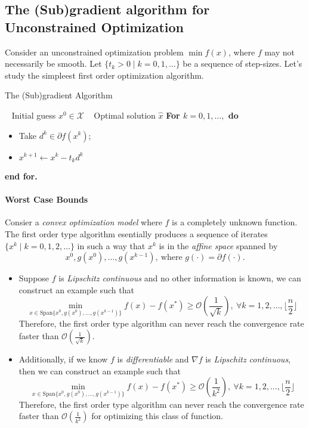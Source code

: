 \subsection{The (Sub)gradient algorithm for Unconstrained Optimization}
Consider an unconstrained optimization problem $\min f(x)$, where $f$ may not necessarily be smooth. Let $\{t_k>0\mid k=0,1,\dots\}$ be a sequence of step-sizes. Let's study the simpleest first order optimization algorithm.
\begin{algorithm}[htb] 
\caption{The (Sub)gradient Algorithm} 
\label{alg:GA} 
\begin{algorithmic}[0] %
\REQUIRE ~ %
Initial guess $x^0\in\mathcal{X}$
\ENSURE ~ %
Optimal solution $\hat x$
\STATE \textbf{For $k=0,1,\dots,$ do}
\begin{itemize}
\item
Take $d^k\in\partial f(x^k)$;
\item
$x^{k+1} \leftarrow x^k - t_kd^k $
\end{itemize}
\textbf{end for.}
\label{code:GA}
\end{algorithmic}
\end{algorithm}
\paragraph{Worst Case Bounds}
Consier a \emph{convex optimization model} where $f$ is a completely unknown function. 
The first order type algorithm esentially produces a sequence of iterates $\{x^k\mid k=0,1,2,\dots\}$ in such a way that $x^k$ is in the \emph{affine space} spanned by
\[
x^0,g(x^0),\dots,g(x^{k-1}),\ \text{where }g(\cdot) = \partial f(\cdot).
\]
\begin{itemize}
\item
Suppose $f$ is \emph{Lipschitz continuous} and no other information is known, we can construct an example such that
\[
\min_{x\in\text{Span}\{x^0,g(x^0),\dots,g(x^{k-1})\}}f(x) - f(x^*)\ge \mathcal{O}(\frac{1}{\sqrt{k}}),\ \forall k=1,2,\dots,\lfloor\frac{n}{2}\rfloor
\]
Therefore, the first order type algorithm can never reach the convergence rate faster than $\mathcal{O}(\frac{1}{\sqrt{k}})$.
\item
Additionally, if we know $f$ is \emph{differentiable} and $\nabla f$ is \emph{Lipschitz continuous}, then we can construct an example such that
\[
\min_{x\in\text{Span}\{x^0,g(x^0),\dots,g(x^{k-1})\}}f(x) - f(x^*)\ge \mathcal{O}(\frac{1}{k^2}),\ \forall k=1,2,\dots,\lfloor\frac{n}{2}\rfloor
\]
Therefore, the first order type algorithm can never reach the convergence rate faster than $\mathcal{O}(\frac{1}{k^2})$ for optimizing this class of function.
\end{itemize}

